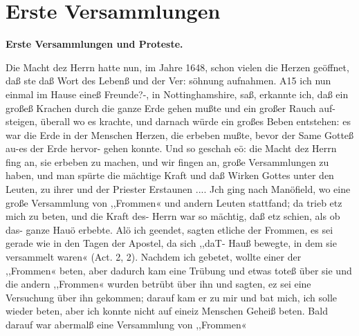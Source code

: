 \chapter[Erste Versammlungen]{Erste Versammlungen}

\begin{center}
\textbf{Erste Versammlungen und Proteste.}
\end{center}

Die Macht dez Herrn hatte nun, im Jahre 1648, schon vielen
die Herzen geöffnet, daß ste daß Wort des Lebenß und der Ver:
söhnung aufnahmen. A15 ich nun einmal im Hause eineß Freunde?-,
in Nottinghamshire, saß, erkannte ich, daß ein großeß Krachen
durch die ganze Erde gehen mußte und ein großer Rauch auf-
steigen, überall wo es krachte, und darnach würde ein großes
Beben entstehen: es war die Erde in der Menschen Herzen, die
erbeben mußte, bevor der Same Gotteß au-es der Erde hervor-
gehen konnte. Und so geschah eö: die Macht dez Herrn fing an,
sie erbeben zu machen, und wir fingen an, große Versammlungen
zu haben, und man spürte die mächtige Kraft und daß Wirken
Gottes unter den Leuten, zu ihrer und der Priester Erstaunen ....
Jch ging nach Manöfield, wo eine große Versammlung von
,,Frommen« und andern Leuten stattfand; da trieb etz mich zu
beten, und die Kraft des- Herrn war so mächtig, daß etz schien,
als ob das- ganze Hauö erbebte. Alö ich geendet, sagten etliche
der Frommen, es sei gerade wie in den Tagen der Apostel, da
sich ,,daT- Hauß bewegte, in dem sie versammelt waren« (Act. 2, 2).
Nachdem ich gebetet, wollte einer der ,,Frommen« beten, aber
dadurch kam eine Trübung und etwas toteß über sie und die
andern ,,Frommen« wurden betrübt über ihn und sagten, ez sei
eine Versuchung über ihn gekommen; darauf kam er zu mir und
bat mich, ich solle wieder beten, aber ich konnte nicht auf eineiz
Menschen Geheiß beten.
Bald darauf war abermalß eine Versammlung von ,,Frommen«


